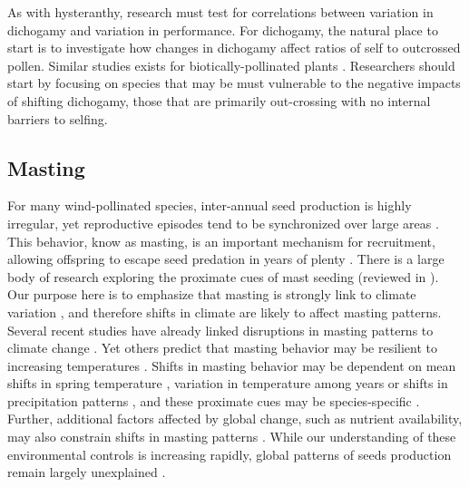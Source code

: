 \documentclass[11pt]{article}
\begin{document}
\noindent As with hysteranthy, research must test for correlations between variation in dichogamy and variation in performance. For dichogamy, the natural place to start is to investigate how changes in dichogamy affect ratios of self to outcrossed pollen. Similar studies exists for biotically-pollinated plants \citep[e.g.][]{Koski:2018aa,Kalisz:2011aa}. Researchers should start by focusing on species that may be must vulnerable to the negative impacts of shifting dichogamy, those that are primarily out-crossing with no internal barriers to selfing.\\

\subsection*{Masting}

\noindent For many wind-pollinated species, inter-annual seed production is highly irregular, yet reproductive episodes tend to be synchronized over large areas \citep{Bogdziewicz2017}. This behavior, know as masting, is an important mechanism for recruitment, allowing offspring to escape seed predation in years of plenty \citep{Janzen:1971aa}. There is a large body of research exploring the proximate cues of mast seeding (reviewed in \citet{Kelly:2002aa,Pearse:2016aa}). Our purpose here is to emphasize that masting is strongly link to climate variation \citep{Bogdziewicz2017,Koenig:2015aa,Kelly:2002aa,McKone1998}, and therefore shifts in climate are likely to affect masting patterns.\\

\noindent Several recent studies have already linked disruptions in masting patterns to climate change \citep{Bogdziewicz:2020aa,Shibata2020}. Yet others predict that masting behavior may be resilient to increasing temperatures \citep{Kelly:2013aa}. Shifts in masting behavior may be dependent on mean shifts in spring temperature \citep{Schermer2020,Bogdziewicz:2018aa}, variation in temperature among years \citep{Kelly:2013aa} or shifts in precipitation patterns \citep{Perez-Ramos:2010aa}, and these proximate cues may be species-specific \citep{Pearse:2020aa}. Further, additional factors affected by global change, such as nutrient availability, may also constrain shifts in masting patterns \citep{Monks:2016aa}. While our understanding of these environmental controls is increasing rapidly, global patterns of seeds production remain largely unexplained \citep{Pearse:2020aa}.\\
\end{document}
